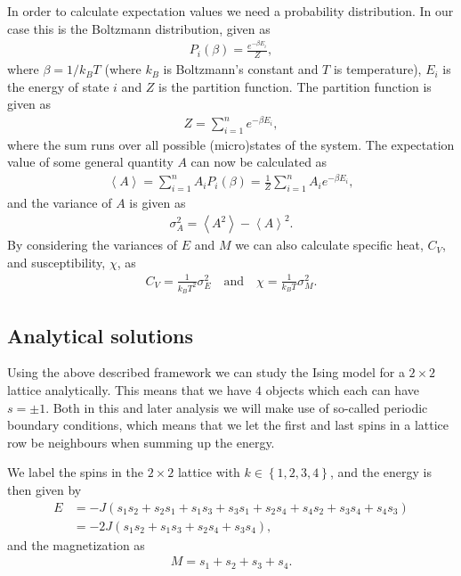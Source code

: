 \documentclass[12pt, a4paper]{article}
\begin{document}
In order to calculate expectation values we need a probability distribution. In our case this is the 
Boltzmann distribution, given as 
\begin{align*}
P_i(\beta) = \frac{e^{-\beta E_i}}{Z}, 
\end{align*}
where $\beta = 1/k_B T$ (where $k_B$ is Boltzmann's constant and $T$ is temperature), $E_i$ is the 
energy of state $i$ and $Z$ is the partition function. The partition function is given as 
\begin{align*}
Z = \sum_{i=1}^n e^{-\beta E_i}, 
\end{align*}
where the sum runs over all possible (micro)states of the system. The expectation value of some 
general quantity $A$ can now be calculated as 
\begin{align*}
\left\langle A \right\rangle = \sum_{i=1}^n A_i P_i(\beta) = \frac{1}{Z} \sum_{i=1}^n A_i e^{-\beta E_i}, 
\end{align*} 
and the variance of $A$ is given as 
\begin{align*}
\sigma_A^2 = \left\langle A^2 \right\rangle - \left\langle A \right\rangle^2. 
\end{align*}
By considering the variances of $E$ and $M$ we can also calculate specific heat, $C_V$, and 
susceptibility, $\chi$, as 
\begin{align*}
C_V = \frac{1}{k_BT^2}\sigma_E^2 \quad \text{and} \quad \chi = \frac{1}{k_B T}\sigma_M^2. 
\end{align*}

\subsection{Analytical solutions}

Using the above described framework we can study the Ising model for a $2\times 2$ lattice analytically. 
This means that we have $4$ objects which each can have $s=\pm 1$. Both in this and later analysis we 
will make use of so-called periodic boundary conditions, which means that we let the first and last 
spins in a lattice row be neighbours when summing up the energy. 

We label the spins in the $2\times 2$ lattice with $k \in \left\lbrace 1,2,3,4\right\rbrace$, and the 
energy is then given by 
\begin{align*}
E & = -J(s_1 s_2 + s_2 s_1 + s_1 s_3 + s_3 s_1 +s_2 s_4 +s_4 s_2 + s_3 s_4 + s_4 s_3) \\
  & = -2J(s_1 s_2 + s_1 s_3 + s_2 s_4 + s_3 s_4),  	
\end{align*}  
and the magnetization as 
\begin{align*}
M = s_1 + s_2 + s_3 + s_4. 
\end{align*}
\end{document}
